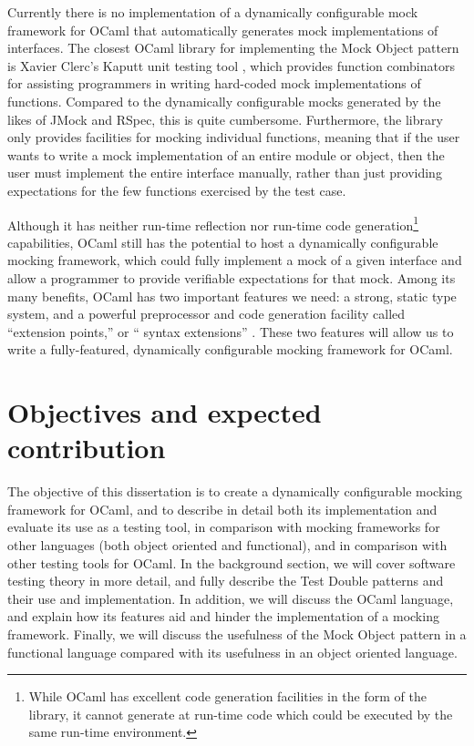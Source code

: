 Currently there is no implementation of a dynamically configurable
mock framework for OCaml that automatically generates mock
implementations of interfaces. The closest OCaml library for
implementing the Mock Object pattern is Xavier Clerc's Kaputt unit
testing tool \cite{www:kaputt}, which provides function combinators
for assisting programmers in writing hard-coded mock implementations
of functions. Compared to the dynamically configurable mocks generated
by the likes of JMock and RSpec, this is quite
cumbersome. Furthermore, the library only provides facilities for
mocking individual functions, meaning that if the user wants to write
a mock implementation of an entire module or object, then the user
must implement the entire interface manually, rather than just
providing expectations for the few functions exercised by the test
case.

Although it has neither run-time reflection nor run-time code
generation\footnote{While OCaml has excellent code generation
  facilities in the form of the  library, it
  cannot generate at run-time code which could be executed by the same
  run-time environment.} capabilities, OCaml still has the potential
to host a dynamically configurable mocking framework, which could
fully implement a mock of a given interface and allow a programmer to
provide verifiable expectations for that mock. Among its many
benefits, OCaml has two important features we need: a strong, static
type system, and a powerful preprocessor and code generation facility
called ``extension points,'' or `` syntax extensions''
\cite{www:ppx}. These two features will allow us to write a
fully-featured, dynamically configurable mocking framework for OCaml.

\section{Objectives and expected contribution}

The objective of this dissertation is to create a dynamically
configurable mocking framework for OCaml, and to describe in detail
both its implementation and evaluate its use as a testing tool, in
comparison with mocking frameworks for other languages (both object
oriented and functional), and in comparison with other testing tools
for OCaml. In the background section, we will cover software testing
theory in more detail, and fully describe the Test Double patterns and
their use and implementation. In addition, we will discuss the OCaml
language, and explain how its features aid and hinder the
implementation of a mocking framework. Finally, we will discuss the
usefulness of the Mock Object pattern in a functional language
compared with its usefulness in an object oriented language.
